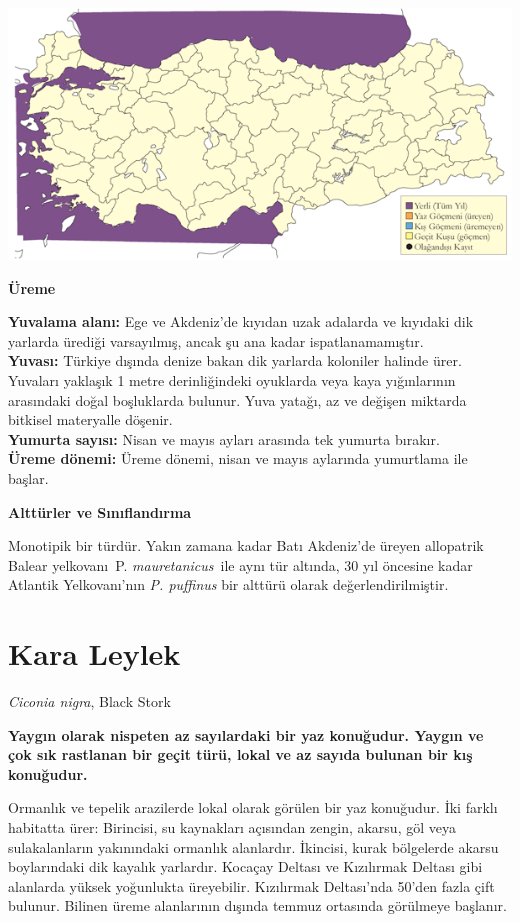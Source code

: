 \documentclass[
  letterpaper,
  DIV=11,
  numbers=noendperiod]{scrreprt}
\begin{document}
\includegraphics{images/harita_Page_049.png}

\textbf{Üreme}

\textbf{Yuvalama alanı:} Ege ve Akdeniz'de kıyıdan uzak adalarda ve
kıyıdaki dik yarlarda ürediği varsayılmış, ancak şu ana kadar
ispatlanamamıştır.\\
\textbf{Yuvası:} Türkiye dışında denize bakan dik yarlarda koloniler
halinde ürer. Yuvaları yaklaşık 1 metre derinliğindeki oyuklarda veya
kaya yığınlarının arasındaki doğal boşluklarda bulunur. Yuva yatağı, az
ve değişen miktarda bitkisel materyalle döşenir.\\
\textbf{Yumurta sayısı:} Nisan ve mayıs ayları arasında tek yumurta
bırakır.\\
\textbf{Üreme dönemi:} Üreme dönemi, nisan ve mayıs aylarında yumurtlama
ile başlar.

\textbf{Alttürler ve Sınıflandırma}

Monotipik bir türdür. Yakın zamana kadar Batı Akdeniz'de üreyen
allopatrik Balear yelkovanı~P. \emph{mauretanicus}~ile aynı tür altında,
30 yıl öncesine kadar Atlantik Yelkovanı'nın \emph{P. puffinus} bir
alttürü olarak değerlendirilmiştir.

\section{Kara Leylek}\label{kara-leylek}

\emph{Ciconia nigra}, Black Stork

\textbf{Yaygın olarak nispeten az sayılardaki bir yaz konuğudur. Yaygın
ve çok sık rastlanan bir geçit türü, lokal ve az sayıda bulunan bir kış
konuğudur.}

Ormanlık ve tepelik arazilerde lokal olarak görülen bir yaz konuğudur.
İki farklı habitatta ürer: Birincisi, su kaynakları açısından zengin,
akarsu, göl veya sulakalanların yakınındaki ormanlık alanlardır.
İkincisi, kurak bölgelerde akarsu boylarındaki dik kayalık yarlardır.
Kocaçay Deltası ve Kızılırmak Deltası gibi alanlarda yüksek yoğunlukta
üreyebilir. Kızılırmak Deltası'nda 50'den fazla çift bulunur. Bilinen
üreme alanlarının dışında temmuz ortasında görülmeye başlanır.
\end{document}
